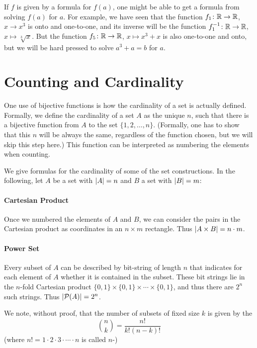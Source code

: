 If $f$ is given by a formula for $f(a)$, one might be able to get a formula  from
solving $f(a)$ for $a$. For example, we have seen that the function $f_1\colon{\mathbb R}\to{\mathbb R}$,
$x\to x^3$ is onto and one-to-one, and its inverse will be the function
$f_1^{-1}\colon{\mathbb R}\to{\mathbb R}$, $x\mapsto\sqrt[3]{x}$. But the function $f_5\colon{\mathbb R}\to{\mathbb R}$,
$x\mapsto x^3+x$ is also one-to-one and  onto, but we will be hard pressed to solve
$a^3+a=b$ for $a$.

\section{Counting and Cardinality}
\label{defcardinality}

One use of bijective functions is how the cardinality of a set is actually defined.
Formally, we
define the cardinality of a set $A$ as the unique $n$, such that there is a bijective
function from $A$ to the set $\{1,2,\ldots,n\}$. (Formally, one has to show that this
$n$ will be always the same, regardless of the function chosen, but we will skip this
step here.) This function can be interpreted as numbering the elements when counting.

We give formulas for the cardinality of some of the set constructions. In the following,
let $A$ be a set with $\left|A\right|=n$ and $B$ a set with $\left|B\right|=m$:

\paragraph{Cartesian Product}
Once we numbered the elements of $A$ and $B$, we can consider the pairs in the Cartesian
product as coordinates in an $n\times m$ rectangle. Thus $\left|A\times B\right|=n\cdot m$.

\paragraph{Power Set}
Every subset of $A$ can be described by bit-string of length $n$ that indicates for each
element of $A$ whether it is contained in the subset. These bit strings lie in the
$n$-fold Cartesian product $\{0,1\}\times\{0,1\}\times\cdots\times\{0,1\}$, and thus
there are $2^n$ such strings. Thus $\left|{\mathcal P}(A)\right|=2^n$.

We note, without proof, that the number of subsets of fixed size $k$ is given by the
\[
{n\choose k}=\frac{n!}{k!(n-k)!}
\]
(where $n!=1\cdot 2\cdot 3\cdot\cdots\cdot n$ is called $n$-)

